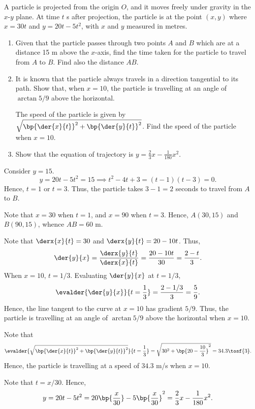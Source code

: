 \begin{problem}
    A particle is projected from the origin $O$, and it moves freely under gravity in the $x$-$y$ plane. At time $t$ s after projection, the particle is at the point $(x,y)$ where $x=30t$ and $y=20t-5t^2$, with $x$ and $y$ measured in metres.

    \begin{enumerate}
        \item Given that the particle passes through two points $A$ and $B$ which are at a distance 15 m above the $x$-axis, find the time taken for the particle to travel from $A$ to $B$. Find also the distance $AB$.
        \item It is known that the particle always travels in a direction tangential to its path. Show that, when $x=10$, the particle is travelling at an angle of $\arctan{5/9}$ above the horizontal.
        
        The speed of the particle is given by $\sqrt{\bp{\der{x}{t}}^2 + \bp{\der{y}{t}}^2}$. Find the speed of the particle when $x = 10$.
        \item Show that the equation of trajectory is $y = \frac23 x - \frac1{180} x^2$.
    \end{enumerate}
\end{problem}
\begin{solution}
    \begin{ppart}
        Consider $y = 15$. \[y = 20t-5t^2 = 15 \implies t^2-4t+3 = (t-1)(t-3) = 0.\] Hence, $t = 1$ or $t = 3$. Thus, the particle takes $3 - 1 = 2$ seconds to travel from $A$ to $B$.

        Note that $x = 30$ when $t = 1$, and $x = 90$ when $t = 3$. Hence, $A(30, 15)$ and $B(90, 15)$, whence $AB = 60$ m.
    \end{ppart}
    \begin{ppart}
        Note that $\derx{x}{t} = 30$ and $\derx{y}{t} = 20-10t$. Thus, \[\der{y}{x} = \frac{\derx{y}{t}}{\derx{x}{t}} = \frac{20-10t}{30} = \frac{2-t}3.\]
        When $x = 10$, $t = 1/3$. Evaluating $\der{y}{x}$ at $t = 1/3$, \[\evalder{\der{y}{x}}{t = \frac13} = \frac{2-1/3}{3} = \frac59.\]
        Hence, the line tangent to the curve at $x=10$ has gradient $5/9$. Thus, the particle is travelling at an angle of $\arctan{5/9}$ above the horizontal when $x=10$.
        
        Note that \[\evalder{\sqrt{\bp{\der{x}{t}}^2 + \bp{\der{y}{t}}^2}}{t=\frac13} = \sqrt{30^2 + \bp{20 - \frac{10}3}^2} = 34.3 \tosf{3}.\] Hence, the particle is travelling at a speed of $34.3$ m/s when $x = 10$.
    \end{ppart}
    \begin{ppart}
        Note that $t = x/30$. Hence, \[y = 20t - 5t^2 = 20\bp{\frac{x}{30}} - 5\bp{\frac{x}{30}}^2 = \frac23 x - \frac1{180}x^2.\]
    \end{ppart}
\end{solution}